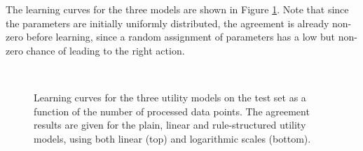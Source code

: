 The learning curves for the three models are shown in Figure \ref{results}.   Note that since the parameters are initially uniformly distributed, the agreement is already non-zero before learning, since a random assignment of parameters has a low but non-zero chance of leading to the right action. 


\begin{figure}[p!]
\begin{center}\end{center} $\phantom{a}$\vspace{8mm}$\phantom{a}$ 
\begin{center}\end{center}
\caption{Learning curves for the three utility models on the test set as a function of the number of processed data points.  The agreement results are given for the plain, linear and rule-structured utility models, using both linear (top) and logarithmic scales (bottom).}
\label{results}
\end{figure}


